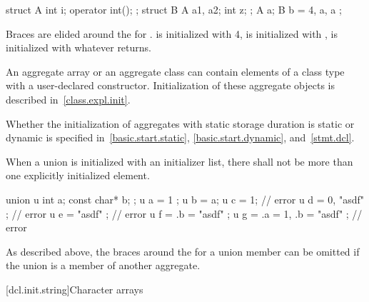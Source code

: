 \begin{example}
\begin{codeblock}
struct A {
  int i;
  operator int();
};
struct B {
  A a1, a2;
  int z;
};
A a;
B b = { 4, a, a };
\end{codeblock}

Braces are elided around the
for
.
is initialized with 4,
is initialized with
,
is initialized with whatever
returns.
\end{example}

\pnum
{}%
\begin{note}
An aggregate array or an aggregate class can contain elements of a
class type with a user-declared constructor.
Initialization of these aggregate objects is described in~\ref{class.expl.init}.
\end{note}

\pnum
\begin{note}
Whether the initialization of aggregates with static storage duration
is static or dynamic is specified
in~\ref{basic.start.static}, \ref{basic.start.dynamic}, and~\ref{stmt.dcl}.
\end{note}

\pnum
{}%
When a union is initialized with an initializer list,
there shall not be more than one
explicitly initialized element.
\begin{example}
\begin{codeblock}
union u { int a; const char* b; };
u a = { 1 };
u b = a;
u c = 1;                        // error
u d = { 0, "asdf" };            // error
u e = { "asdf" };               // error
u f = { .b = "asdf" };
u g = { .a = 1, .b = "asdf" };  // error
\end{codeblock}
\end{example}

\pnum
\begin{note}
As described above,
the braces around the
for a union member can be omitted if the
union is a member of another aggregate.
\end{note}

[dcl.init.string]{Character arrays}%

